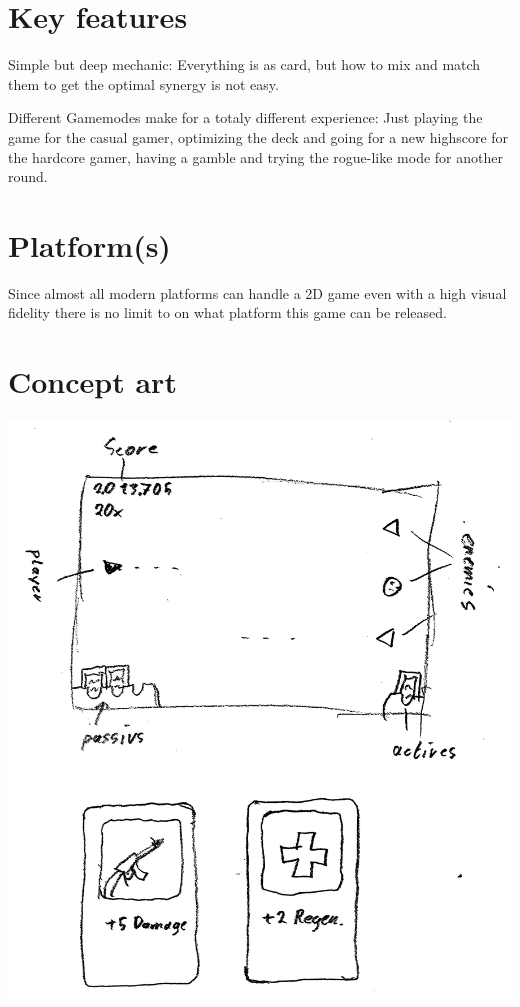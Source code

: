 \documentclass[paper=a4, fontsize=12pt]{scrartcl} %
\numberwithin{equation}{section} %
\numberwithin{figure}{section} %
\numberwithin{table}{section} %
\begin{document}

\section{Key features}

Simple but deep mechanic: Everything is as card, but how to mix and match them to get the optimal synergy is not easy.

Different Gamemodes make for a totaly different experience: Just playing the game for the casual gamer, optimizing the deck and going for a new highscore for the hardcore gamer, having a gamble and trying the rogue-like mode for another round.



\section{Platform(s)}

Since almost all modern platforms can handle a 2D game even with a high visual fidelity there is no limit to on what platform this game can be released.


\section{Concept art}
\includegraphics[natwidth=2106,natheight=2416]{conceptart.png}
\end{document}
